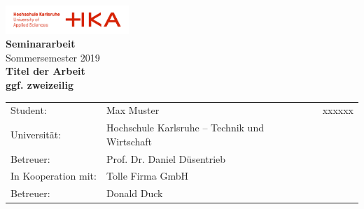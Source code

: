 \documentclass[12pt,digital]{hska}
\begin{document}

% 

\thispagestyle{plain}
\begin{titlepage}
\begin{center}
\includegraphics[width=0.35\textwidth]{images/hka_logo.pdf}\\[12ex]

\LARGE{\textbf{Seminararbeit}\\Sommersemester 2019}\\[8ex]

\textbf{Titel der Arbeit\\
ggf. zweizeilig}\\[12ex]

\normalsize{}
\begin{tabular}{lll}
Student:  & \quad Max Muster & xxxxxx\\[3ex]
Universität: & \quad Hochschule Karlsruhe – Technik und Wirtschaft &\\[1ex]
Betreuer:  & \quad Prof. Dr. Daniel Düsentrieb &\\[3ex]
In Kooperation mit: & \quad Tolle Firma GmbH &\\[1ex]
Betreuer:  & \quad Donald Duck &\\[1ex]
\end{tabular}

\end{center}
\end{titlepage}

\tableofcontents
\end{document}
